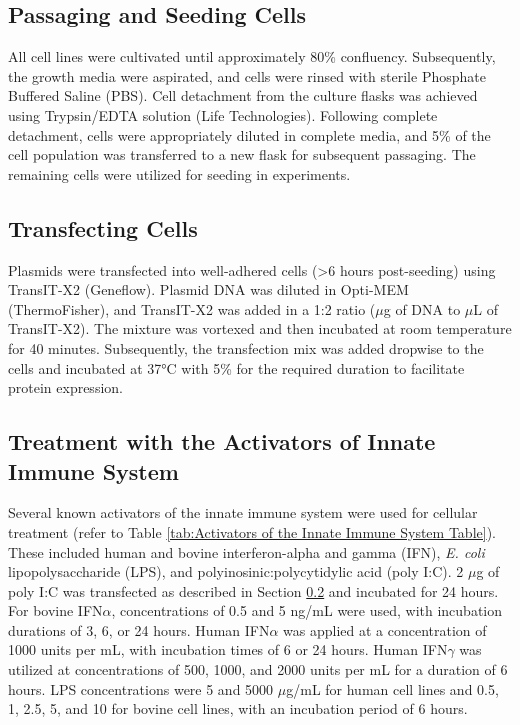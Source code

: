 \subsection{Passaging and Seeding Cells} \label{subsec:Passaging and Seeding Cells}
All cell lines were cultivated until approximately 80\% confluency. Subsequently, the growth media were aspirated, and cells were rinsed with sterile Phosphate Buffered Saline (PBS). Cell detachment from the culture flasks was achieved using Trypsin/EDTA solution (Life Technologies). Following complete detachment, cells were appropriately diluted in complete media, and 5\% of the cell population was transferred to a new flask for subsequent passaging. The remaining cells were utilized for seeding in experiments.

\subsection{Transfecting Cells} \label{subsec:Transfecting Cells}
Plasmids were transfected into well-adhered cells (>6 hours post-seeding) using TransIT-X2 (Geneflow). Plasmid DNA was diluted in Opti-MEM (ThermoFisher), and TransIT-X2 was added in a 1:2 ratio ($\mu$g of DNA to $\mu$L of TransIT-X2). The mixture was vortexed and then incubated at room temperature for 40 minutes. Subsequently, the transfection mix was added dropwise to the cells and incubated at 37°C with 5\%  for the required duration to facilitate protein expression.


\subsection{Treatment with the Activators of Innate Immune System} \label{subsec:Treatment with the Activators of Innate Immune System}
Several known activators of the innate immune system were used for cellular treatment (refer to Table \ref{tab:Activators of the Innate Immune System Table}). These included human and bovine interferon-alpha and gamma (IFN), \textit{E. coli} lipopolysaccharide (LPS), and polyinosinic:polycytidylic acid (poly I:C). 2 $\mu$g of poly I:C was transfected as described in Section \ref{subsec:Transfecting Cells} and incubated for 24 hours. For bovine IFN$\alpha$, concentrations of 0.5 and 5 ng/mL were used, with incubation durations of 3, 6, or 24 hours. Human IFN$\alpha$ was applied at a concentration of 1000 units per mL, with incubation times of 6 or 24 hours. Human IFN$\gamma$ was utilized at concentrations of 500, 1000, and 2000 units per mL for a duration of 6 hours. LPS concentrations were 5 and 5000 $\mu$g/mL for human cell lines and 0.5, 1, 2.5, 5, and 10 for bovine cell lines, with an incubation period of 6 hours.

